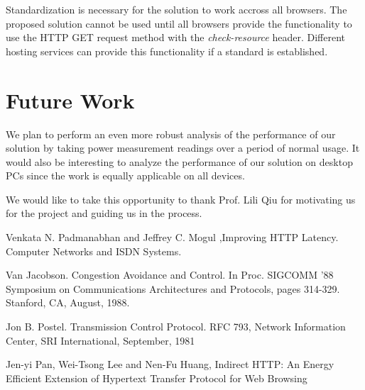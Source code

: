 \documentclass{sigplanconf}
\begin{document}
Standardization is necessary for the solution to work accross all browsers. The proposed solution cannot be used until all browsers provide the functionality to use the HTTP GET request method with the {\it check-resource} header. Different hosting services can provide this functionality if a standard is established.

\section{Future Work}

We plan to perform an even more robust analysis of the performance of our solution by taking power measurement readings over a period of normal usage. It would also be interesting to analyze the performance of our solution on desktop PCs since the work is equally applicable on all devices. 

\acks

We would like to take this opportunity to thank Prof. Lili Qiu for motivating us for the project and guiding us in the process.



\begin{thebibliography}{}
\softraggedright

 Venkata N. Padmanabhan and Jeffrey C. Mogul ,Improving HTTP Latency. Computer Networks and ISDN Systems.

Van Jacobson. Congestion Avoidance and Control. In Proc. SIGCOMM ’88 Symposium on Communications Architectures and Protocols, pages 314-329. Stanford, CA, August, 1988.

Jon B. Postel. Transmission Control Protocol. RFC 793, Network Information Center, SRI International, September, 1981

Jen-yi Pan, Wei-Tsong Lee and Nen-Fu Huang, Indirect HTTP: An Energy Efficient Extension of Hypertext Transfer Protocol for Web Browsing

\end{thebibliography}
\end{document}
